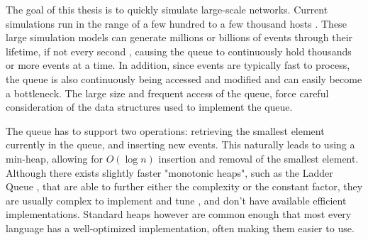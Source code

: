 The goal of this thesis is to quickly simulate large-scale \datacenter networks.
Current \datacenter simulations run in the range of a few hundred to a few thousand hosts \opera\rotornet.
These large simulation models can generate millions or billions of events through their lifetime, if not every second \cite{fujimoto_parallel_2015}, causing the queue to continuously hold thousands or more events at a time. 
In addition, since events are typically fast to process, the queue is also continuously being accessed and modified and can easily become a bottleneck.
The large size and frequent access of the queue, force careful consideration of the data structures used to implement the queue.


The queue has to support two operations: retrieving the smallest element currently in the queue, and inserting new events.
This naturally leads to using a min-heap, allowing for $O\left(\log n\right)$ insertion and removal of the smallest element.
Although there exists slightly faster "monotonic heaps", such as the Ladder Queue \cite{tang_ladder_2005}, that are able to further either the complexity or the constant factor, they are usually complex to implement and tune \cite{furfaro_adaptive_2018}, and don't have available efficient implementations. 
Standard heaps however are common enough that most every language has a well-optimized implementation, often making them easier to use. 

